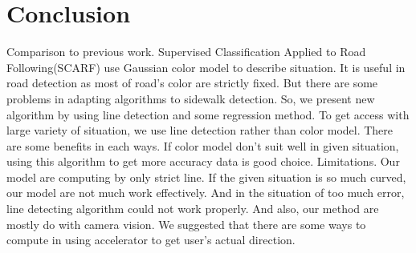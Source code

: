 \section{Conclusion}
Comparison to previous work. 
Supervised Classification Applied to Road Following(SCARF) use Gaussian color model to describe situation. It is useful in road detection as most of road's color are strictly fixed. But there are some problems in adapting algorithms to sidewalk detection. So, we present new algorithm by using line detection and some regression method. To get access with large variety of situation, we use line detection rather than color model. There are some benefits in each ways. If color model don't suit well in given situation, using this algorithm to get more accuracy data is good choice. 
Limitations. Our model are computing by only strict line. If the given situation is so much curved, our model are not much work effectively. And in the situation of too much error, line detecting algorithm could not work properly. And also, our method are mostly do with camera vision. We suggested that there are some ways to compute in using accelerator to get user's actual direction. 
\label{sec:conclusion}